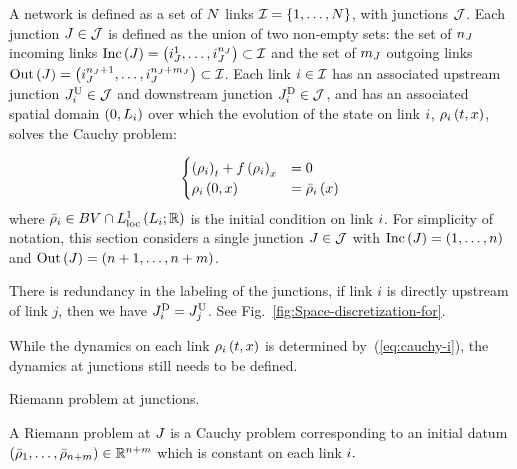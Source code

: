 A network
is defined as a set of $N$ links $\mathcal{I}=\left\{ 1,\ldots,N\right\}$,
with junctions $\mathcal{J}$. Each junction $J\in\mathcal{J}$ is defined
as the union of  two non-empty sets: the set of $n_{J}$ incoming links $\text{Inc}\left(J\right)=\left(i_{J}^{1},\ldots,i_{J}^{n_{J}}\right)\subset\mathcal{I}$
and the set of $m_{J}$ outgoing links $\text{Out}\left(J\right)=\left(i_{J}^{n_{J}+1},\ldots,i_{J}^{n_{J}+m_{J}}\right)\subset\mathcal{I}$.
Each link $i\in\mathcal{I}$ has an associated upstream junction $J_{i}^{\text{U}}\in\mathcal{J}$
and downstream junction $J_{i}^{\text{D}}\in\mathcal{J}$, and has an associated
spatial domain $\left(0,L_{i}\right)$ over which the evolution
of the state on link $i$, $\rho_{i}\left(t,x\right)$, solves
the Cauchy problem:

\begin{equation}
\begin{cases}
\left(\rho_{i}\right)_{t}+f\left(\rho_{i}\right)_{x} & =0\\
\rho_{i}\left(0,x\right) & =\bar{\rho}_{i}\left(x\right)
\end{cases}\label{eq:cauchy-i}
\end{equation}
where $\bar{\rho}_{i}\in BV\cap L_{\text{loc}}^{1}\left(L_i;\mathbb{R}\right)$
is the initial condition on link $i$. For simplicity of notation,
this section considers a single junction $J\in\mathcal{J}$ with $\text{Inc}\left(J\right)=\left(1,\ldots,n\right)$
and $\text{Out}\left(J\right)=\left(n+1,\ldots,n+m\right)$.
\begin{rem}
There is redundancy in the labeling of the junctions, if link
$i$ is directly upstream of link $j$, then we have $J_{i}^{\text{D}}=J_{j}^{\text{U}}$.
See Fig.~\ref{fig:Space-discretization-for}.
\end{rem}
While the dynamics on each link $\rho_{i}\left(t,x\right)$ is
determined by~(\ref{eq:cauchy-i}), the dynamics at junctions
still needs to be defined.
\begin{defn}
Riemann problem at junctions. 

A Riemann problem at $J$ is a Cauchy problem corresponding to an initial datum $\left(\bar{\rho}_{1},\ldots,\bar{\rho}_{n+m}\right)\in\mathbb{R}^{n+m}$ which is constant on each link $i.$

\end{defn}
